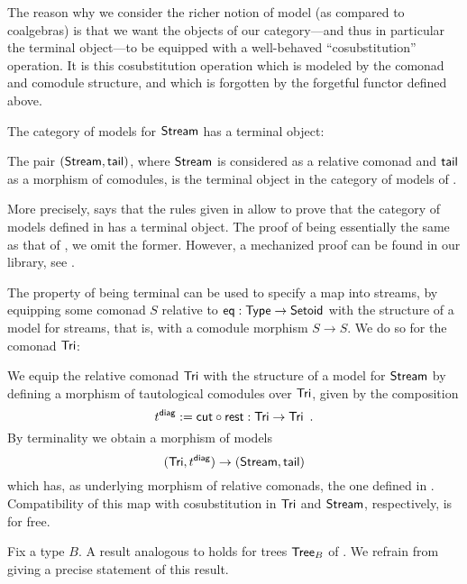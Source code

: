 \documentclass[a4paper,USenglish]{lipics}
\begin{document}
  The reason why we consider the richer notion of model (as compared to coalgebras) is that we want the objects of 
  our category---and thus in particular the terminal object---to be equipped with a well-behaved \enquote{cosubstitution} operation.
  It is this cosubstitution operation which is modeled by the comonad and comodule structure, and which is forgotten by 
  the forgetful functor defined above.

  
  The category of models for $\mathsf{Stream}$ has a terminal object:
  
\begin{thm}\label{thm_stream_terminal}
 The pair $(\mathsf{Stream}, \mathsf{tail})$, where $\mathsf{Stream}$ is considered as a relative comonad and $\mathsf{tail}$ as
 a morphism of comodules, is the terminal object in the category of models of .
\end{thm}

More precisely,  says that the rules given in  allow to prove that
the category of models defined in  has a terminal object.
The proof of  being essentially the same as that of , we omit the former.
However, a mechanized proof can be found in our \coq library, see .


The property of being terminal can be used to specify a map into streams, by equipping some comonad $S$ relative to $\mathsf{eq}:\mathsf{Type}\to\mathsf{Setoid}$
with the structure of a model for streams, that is, with a comodule morphism $S\to S$.
We do so for the comonad $\mathsf{Tri}$:

\begin{ex}\label{ex_diag_terminal}
  We equip the relative comonad $\mathsf{Tri}$ with the structure of a model for $\mathsf{Stream}$ by defining a 
  morphism of tautological comodules over $\mathsf{Tri}$, given by the composition
   \[ t^{\mathsf{diag}} := {\mathsf{cut}} \circ {\ensuremath{\mathsf{rest}}}  : \mathsf{Tri} \to \mathsf{Tri} \enspace . \]
  By terminality we obtain a morphism of models
   \[(\mathsf{Tri}, t^{\mathsf{diag}}) \to (\mathsf{Stream}, \mathsf{tail}) \] 
  which has, as underlying morphism of relative comonads, the one defined in . 
  Compatibility of this map with cosubstitution in $\mathsf{Tri}$ and $\mathsf{Stream}$, respectively,
  is for free.
\end{ex}

 
\begin{rem}
 Fix a type $B$. A result analogous to  holds for trees $\mathsf{Tree}_B$ of . 
 We refrain from giving a precise statement of this result.
\end{rem}
\end{document}
